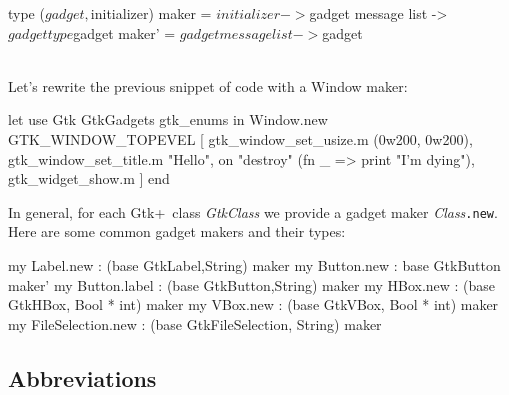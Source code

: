 \documentclass{article}
\newcommand{\gtk}{\mbox{\sf Gtk+}}
\begin{document}
\begin{smldisp}
   type ($gadget,$initializer) maker = 
       $initializer -> $gadget message list -> $gadget 
   type $gadget maker' = $gadget message list -> $gadget
\end{smldisp}

\ \\
Let's rewrite the previous snippet of code with a Window maker:

\begin{smldisp}
   let use Gtk GtkGadgets gtk_enums
   in  Window.new GTK_WINDOW_TOPEVEL
        [ gtk_window_set_usize.m (0w200, 0w200),
          gtk_window_set_title.m "Hello",
          on "destroy" (fn _ => print "I'm dying"),
          gtk_widget_show.m
        ] 
   end
\end{smldisp}

In general, for each \gtk\ class {\em GtkClass} we provide a gadget
maker {\em Class}\verb|.new|.  Here are some common gadget makers and their
types:

\begin{smldisp}
   my Label.new    : (base GtkLabel,String) maker
   my Button.new   : base GtkButton maker'
   my Button.label : (base GtkButton,String) maker
   my HBox.new     : (base GtkHBox, Bool * int) maker
   my VBox.new     : (base GtkVBox, Bool * int) maker
   my FileSelection.new : (base GtkFileSelection, String) maker
\end{smldisp}

\subsection{Abbreviations}
\end{document}
